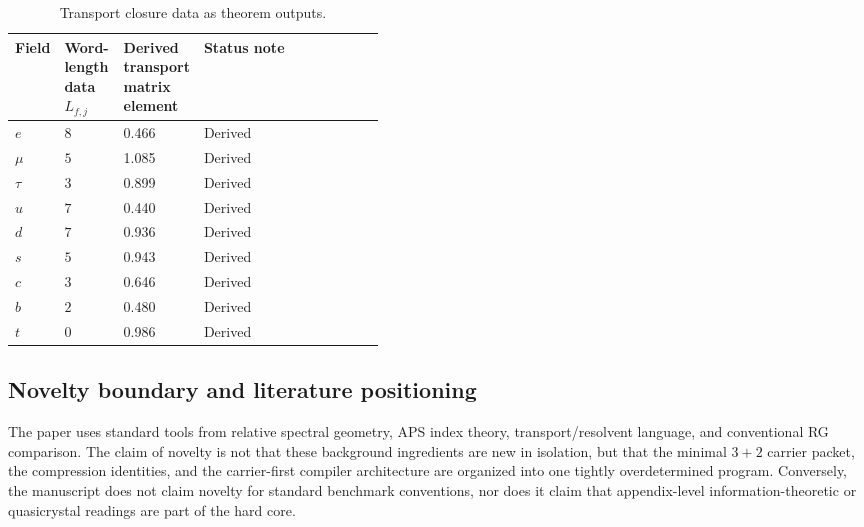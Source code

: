 \documentclass[11pt,a4paper]{article}
\theoremstyle{definition}
\theoremstyle{remark}
\begin{document}
\begin{table}[H]
\centering
\scriptsize
\begin{tabularx}{\linewidth}{@{}>{\raggedright\arraybackslash}p{0.11\linewidth}>{\centering\arraybackslash}p{0.16\linewidth}>{\raggedleft\arraybackslash}p{0.16\linewidth}Y@{}}
\toprule
Field & Word-length data $L_{f,j}$ & Derived transport matrix element & Status note \\
\midrule
$e$ & $8$ & \num{0.466} & Derived \\
$\mu$ & $5$ & \num{1.085} & Derived \\
$\tau$ & $3$ & \num{0.899} & Derived \\
$u$ & $7$ & \num{0.440} & Derived \\
$d$ & $7$ & \num{0.936} & Derived \\
$s$ & $5$ & \num{0.943} & Derived \\
$c$ & $3$ & \num{0.646} & Derived \\
$b$ & $2$ & \num{0.480} & Derived \\
$t$ & $0$ & \num{0.986} & Derived \\
\bottomrule
\end{tabularx}
\caption{Transport closure data as theorem outputs.}
\label{tab:yukawa-residuals}
\end{table}

\subsection{Novelty boundary and literature positioning}

The paper uses standard tools from relative spectral geometry, APS index theory, transport/resolvent language, and conventional RG comparison. The claim of novelty is not that these background ingredients are new in isolation, but that the minimal $3+2$ carrier packet, the compression identities, and the carrier-first compiler architecture are organized into one tightly overdetermined program. Conversely, the manuscript does not claim novelty for standard benchmark conventions, nor does it claim that appendix-level information-theoretic or quasicrystal readings are part of the hard core.
\end{document}

